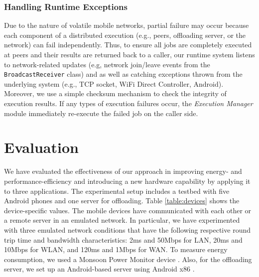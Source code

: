 \documentclass{sig-alternate}
\begin{document}
\subsubsection{Handling Runtime Exceptions}
Due to the nature of volatile mobile networks, partial failure may occur because each component of a distributed execution (e.g., peers, offloading server, or the network) can fail independently. Thus, to ensure all jobs are completely executed at peers and their results are returned back to a caller, our runtime system listens to network-related updates (e.g, network join/leave events from the \texttt{BroadcastReceiver} class) and as well as catching exceptions thrown from the underlying system (e.g., TCP socket, WiFi Direct Controller, Android). Moreover, we use a simple checksum mechanism to check the integrity of execution results. If any types of execution failures occur, the \emph{Execution Manager} module immediately re-execute the failed job on the caller side.

  
\section{Evaluation}
\label{sec:eval}
We have evaluated the effectiveness of our approach in improving energy- and performance-efficiency and introducing a new hardware capability by applying it to three applications. The experimental setup includes a testbed with five Android phones and one server for offloading. Table \ref{table:devices} shows the device-specific values. The mobile devices have communicated with each other or a remote server in an emulated network. In particular, we have experimented with three emulated network conditions that have the following respective round trip time and bandwidth characteristics: 2ms and 50Mbps for LAN, 20ms and 10Mbps for WLAN, and 120ms and 1Mbps for WAN. To measure energy consumption, we used a Monsoon Power Monitor device \cite{moosoon}. Also, for the offloading server, we set up an Android-based server using Android x86 \cite{android-x86}.
\end{document}
